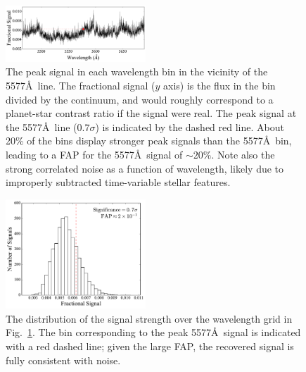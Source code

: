 \documentclass{emulateapj}
\begin{document}
\begin{figure}[bt]
\includegraphics[width=0.47\textwidth]{5577_max_signal_vs_wavelength.pdf}
\caption{The peak signal in each wavelength bin in the vicinity of the 5577\AA\ line. The fractional signal ($y$ axis) is the flux in the bin divided by the continuum, and would roughly correspond to a planet-star contrast ratio if the signal were real. The peak signal at the 5577\AA\ line ($0.7\sigma$) is indicated by the dashed red line. About 20\% of the bins display stronger peak signals than the 5577\AA\ bin, leading to a FAP for the 5577\AA\ signal of ${\sim} 20\%$. Note also the strong correlated noise as a function of wavelength, likely due to improperly subtracted time-variable stellar features.\\[0in]}
\label{fig:max_signal_vs_wavelength}
\end{figure}

\begin{figure}[bt]
\includegraphics[width=0.47\textwidth]{5577_fap.pdf}
\caption{The distribution of the signal strength over the wavelength grid in Fig.~\ref{fig:max_signal_vs_wavelength}. The bin corresponding to the peak 5577\AA\ signal is indicated with a red dashed line; given the large FAP, the recovered signal is fully consistent with noise.\\[0in]}
\label{fig:fap}
\end{figure}
\end{document}
